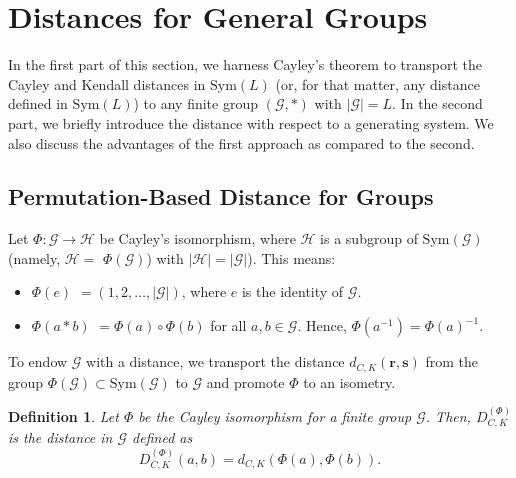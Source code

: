 \documentclass{article}
\newtheorem{definition}[theorem]{Definition}
\begin{document}

\section{Distances for General Groups}

\label{sec:DistforGroups}

In the first part of this section, we harness Cayley's theorem to transport
the Cayley and Kendall distances in $\mathrm{Sym}(L)$ (or, for that matter,
any distance defined in $\mathrm{Sym}(L)$) to any finite group $(\mathcal{G}%
,\ast )$ with $\left\vert \mathcal{G}\right\vert =L$. In the second part, we
briefly introduce the distance with respect to a generating system. We also
discuss the advantages of the first approach as compared to the second.


\subsection{Permutation-Based Distance for Groups}

\label{sec:DistforGroupsSub1}

Let $\Phi :\mathcal{G}\rightarrow \mathcal{H}$ be Cayley's isomorphism,
where $\mathcal{H}$ is a subgroup of $\mathrm{Sym}(\mathcal{G})$ (namely, $%
\mathcal{H}=$ $\Phi (\mathcal{G})$) with $\left\vert \mathcal{H}\right\vert
=\left\vert \mathcal{G}\right\vert $). This means:

\begin{itemize}
\item[\textbf{(i)}] $\Phi (e)$ $=(1,2,\ldots,\left\vert \mathcal{G}\right\vert )$, where $e$ is the identity of $\mathcal{G}$.

\item[\textbf{(ii)}] $\Phi (a\ast b)$ $=\Phi (a)\circ \Phi (b)$ for all $a,b\in \mathcal{G}$. Hence, $\Phi (a^{-1})=\Phi (a)^{-1}$.
\end{itemize}

To endow $\mathcal{G}$ with a distance, we transport the distance $d_{C,K}(\mathbf{r},\mathbf{s})$ from the group $\Phi (\mathcal{G})\subset \mathrm{Sym}(\mathcal{G})$ to $\mathcal{G}$ and promote $\Phi $ to an isometry.

\begin{definition}
\label{DefDist(a,b)}Let $\Phi $ be the Cayley isomorphism for a finite group 
$\mathcal{G}$. Then, $D_{C,K}^{(\Phi )}$ is the distance in $\mathcal{G}$
defined as 
\begin{equation}
D_{C,K}^{(\Phi )}(a,b)=d_{C,K}(\Phi (a),\Phi (b)).  \label{dist(a,b)}
\end{equation}
\end{definition}
\end{document}
